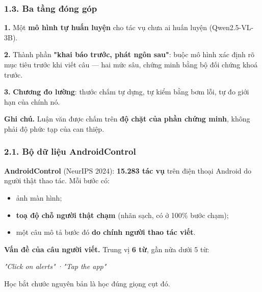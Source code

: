 \documentclass[10pt]{beamer}
\newcommand{\dn}[1]{{\color{dnteal}\textbf{#1}}}
\newcommand{\vd}[1]{{\color{vdblue}\textbf{#1}}}
\newcommand{\chred}[1]{{\color{chapred}\textbf{#1}}}
\newcommand{\ann}[1]{{\color{annmar}\textbf{#1}}}
\newcommand{\nv}[1]{{\color{daunavy}\textbf{#1}}}
\begin{document}
\begin{frame}
  \frametitle{1.3. Ba tầng đóng góp}
  \begin{block}{}
    \nv{1.} Một \nv{mô hình tự huấn luyện} cho tác vụ chưa ai huấn luyện (Qwen2.5-VL-3B).
  \end{block}
  \begin{block}{}
    \nv{2.} Thành phần \chred{"khai báo trước, phát ngôn sau"}: buộc mô hình xác định rõ mục tiêu trước khi viết câu --- hai mức sâu, chứng minh bằng bộ đối chứng khoá trước.
  \end{block}
  \begin{block}{}
    \nv{3.} \nv{Chương đo lường}: thước chấm tự dựng, tự kiểm bằng bơm lỗi, tự đo giới hạn của chính nó.
  \end{block}
  \vspace{1ex}
  \ann{Ghi chú.} Luận văn được chấm trên \nv{độ chặt của phần chứng minh}, không phải độ phức tạp của can thiệp.
\end{frame}

\begin{frame}
  \frametitle{2.1. Bộ dữ liệu AndroidControl}
  \begin{block}{}
    \dn{AndroidControl} (NeurIPS 2024): \nv{15.283 tác vụ} trên điện thoại Android do người thật thao tác. Mỗi bước có:
    \begin{itemize}
      \item ảnh màn hình;
      \item \nv{toạ độ chỗ người thật chạm} (nhãn sạch, có ở 100\% bước chạm);
      \item một câu mô tả bước đó \nv{do chính người thao tác viết}.
    \end{itemize}
  \end{block}
  \begin{block}{}
    \vd{Vấn đề của câu người viết.} Trung vị \nv{6 từ}, gần nửa dưới 5 từ:\par\smallskip
    {\centering \textit{"Click on alerts"} \quad·\quad \textit{"Tap the app"}\par}\smallskip
    Học bắt chước nguyên bản là học đúng giọng cụt đó.
  \end{block}
\end{frame}
\end{document}
